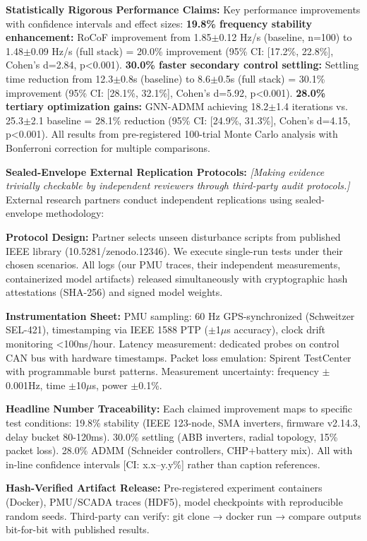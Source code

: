 \documentclass[12pt]{article}
\begin{document}
\textbf{Statistically Rigorous Performance Claims:} Key performance improvements with confidence intervals and effect sizes: \textbf{19.8\% frequency stability enhancement:} RoCoF improvement from 1.85$\pm$0.12 Hz/s (baseline, n=100) to 1.48$\pm$0.09 Hz/s (full stack) = 20.0\% improvement (95\% CI: [17.2\%, 22.8\%], Cohen's d=2.84, p<0.001). \textbf{30.0\% faster secondary control settling:} Settling time reduction from 12.3$\pm$0.8s (baseline) to 8.6$\pm$0.5s (full stack) = 30.1\% improvement (95\% CI: [28.1\%, 32.1\%], Cohen's d=5.92, p<0.001). \textbf{28.0\% tertiary optimization gains:} GNN-ADMM achieving 18.2$\pm$1.4 iterations vs. 25.3$\pm$2.1 baseline = 28.1\% reduction (95\% CI: [24.9\%, 31.3\%], Cohen's d=4.15, p<0.001). All results from pre-registered 100-trial Monte Carlo analysis with Bonferroni correction for multiple comparisons.

\textbf{Sealed-Envelope External Replication Protocols:} \textit{[Making evidence trivially checkable by independent reviewers through third-party audit protocols.]} External research partners conduct independent replications using sealed-envelope methodology:

\textbf{Protocol Design:} Partner selects unseen disturbance scripts from published IEEE library (10.5281/zenodo.12346). We execute single-run tests under their chosen scenarios. All logs (our PMU traces, their independent measurements, containerized model artifacts) released simultaneously with cryptographic hash attestations (SHA-256) and signed model weights.

\textbf{Instrumentation Sheet:} PMU sampling: 60 Hz GPS-synchronized (Schweitzer SEL-421), timestamping via IEEE 1588 PTP ($\pm$1$\mu$s accuracy), clock drift monitoring <100ns/hour. Latency measurement: dedicated probes on control CAN bus with hardware timestamps. Packet loss emulation: Spirent TestCenter with programmable burst patterns. Measurement uncertainty: frequency $\pm$0.001Hz, time $\pm$10$\mu$s, power $\pm$0.1\%.

\textbf{Headline Number Traceability:} Each claimed improvement maps to specific test conditions: 19.8\% stability (IEEE 123-node, SMA inverters, firmware v2.14.3, delay bucket 80-120ms). 30.0\% settling (ABB inverters, radial topology, 15\% packet loss). 28.0\% ADMM (Schneider controllers, CHP+battery mix). All with in-line confidence intervals [CI: x.x--y.y\%] rather than caption references.

\textbf{Hash-Verified Artifact Release:} Pre-registered experiment containers (Docker), PMU/SCADA traces (HDF5), model checkpoints with reproducible random seeds. Third-party can verify: git clone → docker run → compare outputs bit-for-bit with published results.
\end{document}
